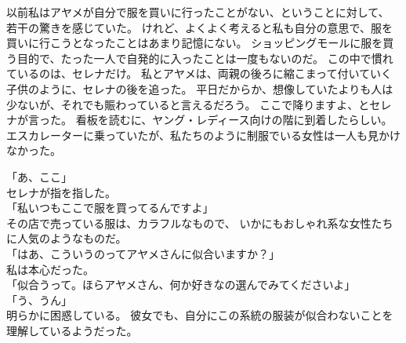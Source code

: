\documentclass[../IHMain]{subfiles}
\begin{document}
以前私はアヤメが自分で服を買いに行ったことがない、ということに対して、
若干の驚きを感じていた。
けれど、よくよく考えると私も自分の意思で、服を買いに行こうとなったことはあまり記憶にない。
ショッピングモールに服を買う目的で、たった一人で自発的に入ったことは一度もないのだ。
この中で慣れているのは、セレナだけ。
私とアヤメは、両親の後ろに縮こまって付いていく子供のように、セレナの後を追った。
平日だからか、想像していたよりも人は少ないが、それでも賑わっていると言えるだろう。
ここで降りますよ、とセレナが言った。
看板を読むに、ヤング・レディース向けの階に到着したらしい。
エスカレーターに乗っていたが、私たちのように制服でいる女性は一人も見かけなかった。

「あ、ここ」\\
セレナが指を指した。\\
「私いつもここで服を買ってるんですよ」\\
その店で売っている服は、カラフルなもので、
いかにもおしゃれ系な女性たちに人気のようなものだ。\\
「はあ、こういうのってアヤメさんに似合いますか？」\\
私は本心だった。\\
「似合うって。ほらアヤメさん、何か好きなの選んでみてくださいよ」\\
「う、うん」\\
明らかに困惑している。
彼女でも、自分にこの系統の服装が似合わないことを理解しているようだった。
\end{document}
